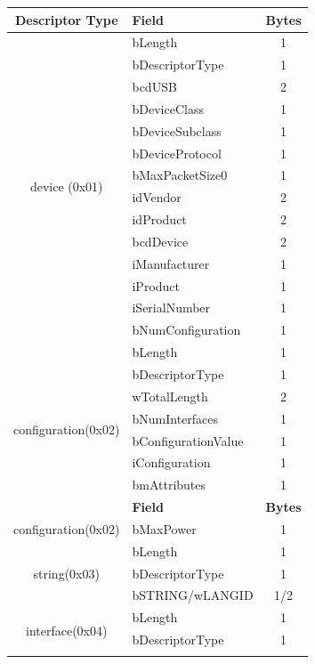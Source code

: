 \begin{longtable}{|c|l|c|} \hline
    \textbf{Descriptor Type} & \textbf{Field} & \textbf{Bytes} \\ \hline
    \multirow{14}{*}{device (0x01)} & bLength & 1 \\ \cline{2-3}
      & bDescriptorType & 1 \\ \cline{2-3}
      & bcdUSB          & 2 \\ \cline{2-3}
      & bDeviceClass    & 1 \\ \cline{2-3}
      & bDeviceSubclass & 1 \\ \cline{2-3}
      & bDeviceProtocol & 1 \\ \cline{2-3}
      & bMaxPacketSize0 & 1 \\ \cline{2-3}
      & idVendor        & 2 \\ \cline{2-3}
      & idProduct       & 2 \\ \cline{2-3}
      & bcdDevice       & 2 \\ \cline{2-3}
      & iManufacturer   & 1 \\ \cline{2-3}
      & iProduct        & 1 \\ \cline{2-3}
      & iSerialNumber   & 1 \\ \cline{2-3}
      & bNumConfiguration & 1 \\ \hline
    \multirow{8}{*}{configuration(0x02)} & bLength & 1 \\ \cline{2-3}
      & bDescriptorType & 1 \\ \cline{2-3}
      & wTotalLength    & 2 \\ \cline{2-3}
      & bNumInterfaces  & 1 \\ \cline{2-3}
      & bConfigurationValue & 1 \\ \cline{2-3}
      & iConfiguration  & 1 \\ \cline{2-3}
      & bmAttributes    & 1 \\ \hline
    \pagebreak \hline
    \textbf{Descriptor Type} & \textbf{Field} & \textbf{Bytes} \\ \hline
      configuration(0x02) & bMaxPower       & 1 \\ \hline
    \multirow{3}{*}{string(0x03)} & bLength & 1 \\ \cline{2-3}
      & bDescriptorType & 1 \\ \cline{2-3}
      & bSTRING/wLANGID & 1/2 \\ \hline
    \multirow{9}{*}{interface(0x04)} & bLength & 1 \\ \cline{2-3}
      & bDescriptorType & 1 \\ \cline{2-3}

\end{longtable}
